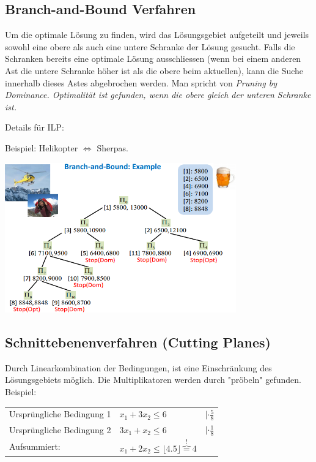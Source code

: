 \subsection{Branch-and-Bound Verfahren }
	\begin{minipage}{8cm}
		Um die optimale Lösung zu finden, wird das Lösungsgebiet aufgeteilt und jeweils sowohl eine obere als auch eine untere Schranke der Lösung gesucht. Falls die Schranken bereits eine optimale Lösung ausschliessen (wenn bei einem anderen Ast die untere Schranke höher ist als die obere beim aktuellen), kann die Suche innerhalb dieses Astes abgebrochen werden. Man spricht von \em Pruning by Dominance\em. Optimalität ist gefunden, wenn die obere gleich der unteren Schranke ist.
		
		Details für ILP: 
	\end{minipage}
	\begin{minipage}{10cm}
		Beispiel: Helikopter $\Leftrightarrow$ Sherpas.
		
		\includegraphics[width=10cm]{Content/IntProg/branch-bound}
	\end{minipage}
  
\subsection{Schnittebenenverfahren (Cutting Planes) }  
	
	Durch Linearkombination der Bedingungen, ist eine Einschränkung des Lösungsgebiets möglich. Die Multiplikatoren werden durch "pröbeln" gefunden. Beispiel:
	
	\begin{tabular}{p{8cm} p{4cm} p{3cm}}
		Ursprüngliche Bedingung 1 & $x_1 + 3 x_2 \leq 6$ & $| \cdot \frac{5}{8}$\\
		Ursprüngliche Bedingung 2 & $3 x_1 + x_2 \leq 6$ & $| \cdot \frac{1}{8}$  \\
		Aufsummiert: & $x_1 + 2 x_2 \leq \lfloor 4.5 \rfloor \overbrace{=}^{!} 4$ \\
	\end{tabular}